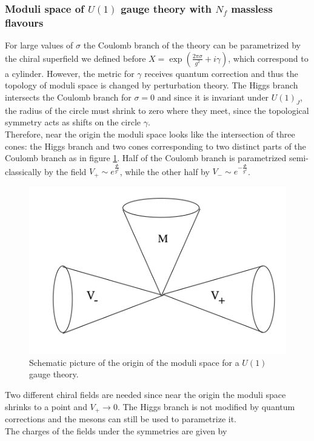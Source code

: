\subsubsection{Moduli space of $U(1)$ gauge theory with $N_f$ massless flavours }
For large values of $\sigma$ the Coulomb branch of the theory can be parametrized by the chiral superfield we defined before $X = \exp{ \left( \frac{ 2 \pi \sigma}{g^2} + i \gamma  \right) } $, which correspond to a cylinder.
However, the metric for $\gamma$ receives quantum correction and thus the topology of moduli space is changed by perturbation theory.
The Higgs branch intersects the Coulomb branch for $\sigma=0$ and since it is invariant under $U(1)_J$, the radius of the circle must shrink to zero where they meet, since the topological symmetry acts as shifts on the circle $\gamma$.
\\
Therefore, near the origin the moduli space looks like the intersection of three cones: the Higgs branch and two cones corresponding to two distinct parts of the Coulomb branch as in figure \ref{fig:u1_origin_cones}.
Half of the Coulomb branch is parametrized semi-classically by the field $V_+ \sim e^{\frac{\Phi}{g^2}}$, while the other half by $V_- \sim e^{ -\frac{\Phi}{g^2} }$. 
\begin{figure}[ht]
\centering
\includegraphics[scale=0.38]{u1_threecones.png}
\caption{Schematic picture of the origin of the moduli space for a $U(1)$ gauge theory.}
\label{fig:u1_origin_cones}
\end{figure}	
Two different chiral fields are needed since near the origin the moduli space shrinks to a point and $V_+ \rightarrow 0$. 
The Higgs branch is not modified by quantum corrections and the mesons can still be used to parametrize it.\\
The charges of the fields under the symmetries are given by
